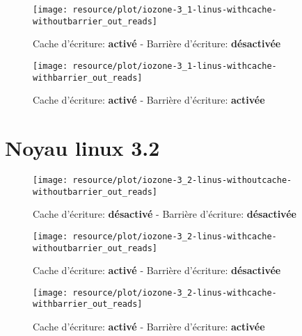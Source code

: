 \begin{figure}[H]
	\centering
	\texttt{[image: resource/plot/iozone-3\_1-linus-withcache-withoutbarrier\_out\_reads]}
	\caption{Cache d'écriture: \textbf{activé}   -   Barrière d'écriture: \textbf{désactivée}}
\end{figure}

\begin{figure}[H]
	\centering
	\texttt{[image: resource/plot/iozone-3\_1-linus-withcache-withbarrier\_out\_reads]}
	\caption{Cache d'écriture: \textbf{activé}   -   Barrière d'écriture: \textbf{activée}}
\end{figure}

\section{Noyau linux 3.2}

\begin{figure}[H]
	\centering
	\texttt{[image: resource/plot/iozone-3\_2-linus-withoutcache-withoutbarrier\_out\_reads]}
	\caption{Cache d'écriture: \textbf{désactivé}   -   Barrière d'écriture: \textbf{désactivée}}
\end{figure}

\begin{figure}[H]
	\centering
	\texttt{[image: resource/plot/iozone-3\_2-linus-withcache-withoutbarrier\_out\_reads]}
	\caption{Cache d'écriture: \textbf{activé}   -   Barrière d'écriture: \textbf{désactivée}}
\end{figure}

\begin{figure}[H]
	\centering
	\texttt{[image: resource/plot/iozone-3\_2-linus-withcache-withbarrier\_out\_reads]}
	\caption{Cache d'écriture: \textbf{activé}   -   Barrière d'écriture: \textbf{activée}}
\end{figure}
